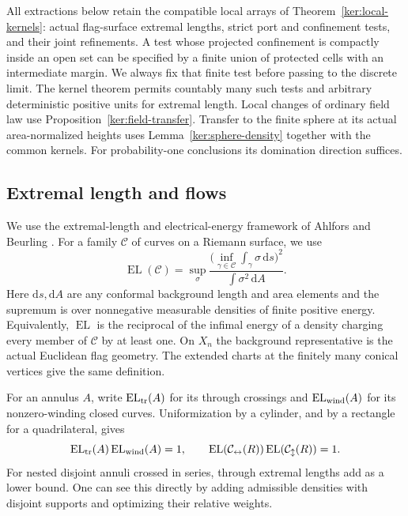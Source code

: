 \documentclass[11pt]{article}
\numberwithin{equation}{section}
\theoremstyle{definition}
\theoremstyle{remark}
\newcommand{\1}{\mathbf 1}
\begin{document}
All extractions below retain the compatible local arrays of
Theorem~\ref{ker:local-kernels}: actual flag-surface extremal lengths,
strict port and confinement tests, and their joint refinements.  A test
whose projected confinement is compactly inside an open set can be
specified by a finite union of protected cells with an intermediate
margin.  We always fix that finite test before passing to the discrete
limit.  The kernel theorem permits countably many such tests and
arbitrary deterministic positive units for extremal length.  Local
changes of ordinary field law use Proposition~\ref{ker:field-transfer}.
Transfer to the finite sphere at its actual area-normalized heights uses
Lemma~\ref{ker:sphere-density} together with the common kernels. For
probability-one conclusions its domination direction suffices.

\subsection{Extremal length and flows}
\label{conf:el-preliminaries}

We use the extremal-length and electrical-energy framework of
Ahlfors and Beurling \cite{AhlforsBeurling1952ConformalInvariants}.
For a family \(\mathcal C\) of curves on a Riemann surface, we use
\begin{equation}
 \operatorname{EL}(\mathcal C)=
 \sup_{\sigma}
 \frac{\bigl(\inf_{\gamma\in\mathcal C}
                 \int_\gamma\sigma\,\mathrm d s\bigr)^2}
      {\int\sigma^2\,\mathrm d A}.
 \label{conf:el-definition}
\end{equation}
Here \(\mathrm d s,\mathrm d A\) are any conformal background length and area
elements and the supremum is over nonnegative measurable densities of
finite positive energy.  Equivalently, \(\operatorname{EL}\) is the reciprocal of
the infimal energy of a density charging every member of \(\mathcal C\)
by at least one.  On \(X_n\) the background representative is the
actual Euclidean flag geometry.  The extended charts at the finitely
many conical vertices give the same definition.

For an annulus \(A\), write \(\operatorname{EL}_{\rm tr}(A)\) for its through
crossings and \(\operatorname{EL}_{\rm wind}(A)\) for its nonzero-winding closed
curves.  Uniformization by a cylinder, and by a rectangle for a
quadrilateral, gives
\begin{equation}
 \operatorname{EL}_{\rm tr}(A)\operatorname{EL}_{\rm wind}(A)=1,
 \qquad
 \operatorname{EL}(\mathcal C_{\leftrightarrow}(R))
 \operatorname{EL}(\mathcal C_{\updownarrow}(R))=1.
 \label{conf:duality}
\end{equation}
For nested disjoint annuli crossed in series, through extremal lengths
add as a lower bound.  One can see this directly by adding admissible
densities with disjoint supports and optimizing their relative weights.
\end{document}
